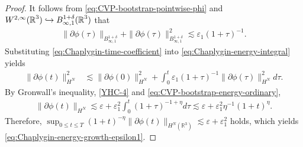 \documentclass[10pt,a4paper]{amsart}
\def\R{\mathop{\mathbb R\kern 0pt}\nolimits}
\def\ds{\displaystyle}
\def\ls{\lesssim}
\def\ve{\varepsilon}
\begin{document}
\begin{proof}
		It follows from \eqref{eq:CVP-bootstrap-pointwise-phi} and $W^{2,\infty}(\R^3) \hookrightarrow B_{\infty,1}^{1+\delta}(\R^3)$ that
		\begin{equation}\label{eq:Chaplygin-time-coefficient}
			\begin{aligned}
				\|\partial\phi(\tau)\|_{B_{\infty,1}^{1+\delta}}
				+\|\partial\phi(\tau)\|_{B_{\infty,1}^{1+\delta}}^2
				\ls
				\varepsilon_1(1+\tau)^{-1}.
			\end{aligned}
		\end{equation}
		Substituting \eqref{eq:Chaplygin-time-coefficient} into
		\eqref{eq:Chaplygin-energy-integral} yields
		\begin{equation}\label{eq:Chaplygin-before-Gronwall}
			\begin{aligned}
				\|\partial\phi(t)\|_{H^N}^2
				&\ls
				\|\partial\phi(0)\|_{H^N}^2
				+
				\int_0^t
				\varepsilon_1(1+\tau)^{-1}
				\|\partial\phi(\tau)\|_{H^N}^2
				d\tau.
			\end{aligned}
		\end{equation}
		By Gronwall's inequality, \eqref{YHC-4} and \eqref{eq:CVP-bootstrap-energy-ordinary},
		\begin{equation}\label{eq:Chaplygin-after-Gronwall}
			\begin{aligned}
				\|\partial\phi(t)\|_{H^N}
				\ls
				\ve + \ve_1^2 \int_{0}^{t} (1+\tau)^{-1+\eta}d\tau
				\ls
				\ve + \ve_1^2 \eta^{-1}(1+t)^\eta.
			\end{aligned}
		\end{equation}
		Therefore, $\ds\sup_{0\le t\le T}(1+t)^{-\eta}\|\partial\phi(t)\|_{H^N(\mathbb R^3)}
			\ls \ve +\ve_1^2$ holds, which yields \eqref{eq:Chaplygin-energy-growth-epsilon1}.
	\end{proof}
\end{document}
